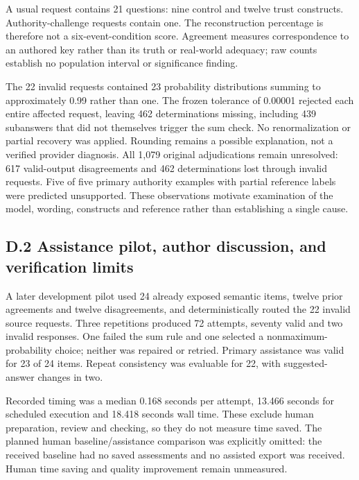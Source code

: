 \documentclass[11pt]{article}
\begin{document}
A usual request contains 21 questions: nine control and twelve trust constructs. Authority-challenge requests contain one. The reconstruction percentage is therefore not a six-event-condition score. Agreement measures correspondence to an authored key rather than its truth or real-world adequacy; raw counts establish no population interval or significance finding.

The 22 invalid requests contained 23 probability distributions summing to approximately 0.99 rather than one. The frozen tolerance of 0.00001 rejected each entire affected request, leaving 462 determinations missing, including 439 subanswers that did not themselves trigger the sum check. No renormalization or partial recovery was applied. Rounding remains a possible explanation, not a verified provider diagnosis. All 1,079 original adjudications remain unresolved: 617 valid-output disagreements and 462 determinations lost through invalid requests. Five of five primary authority examples with partial reference labels were predicted unsupported. These observations motivate examination of the model, wording, constructs and reference rather than establishing a single cause.

\subsection*{D.2 Assistance pilot, author discussion, and verification limits}

A later development pilot used 24 already exposed semantic items, twelve prior agreements and twelve disagreements, and deterministically routed the 22 invalid source requests. Three repetitions produced 72 attempts, seventy valid and two invalid responses. One failed the sum rule and one selected a nonmaximum-probability choice; neither was repaired or retried. Primary assistance was valid for 23 of 24 items. Repeat consistency was evaluable for 22, with suggested-answer changes in two.

Recorded timing was a median 0.168 seconds per attempt, 13.466 seconds for scheduled execution and 18.418 seconds wall time. These exclude human preparation, review and checking, so they do not measure time saved. The planned human baseline/assistance comparison was explicitly omitted: the received baseline had no saved assessments and no assisted export was received. Human time saving and quality improvement remain unmeasured.
\end{document}
